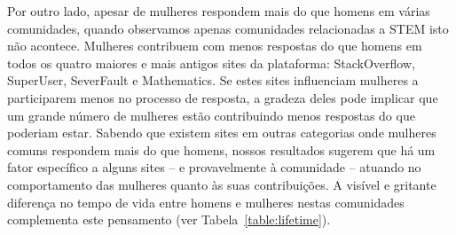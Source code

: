 


Por outro lado, apesar de mulheres respondem mais do que homens em várias comunidades, quando observamos apenas comunidades relacionadas a STEM isto não acontece. Mulheres contribuem com menos respostas do que homens em todos os quatro maiores e mais antigos sites da plataforma: StackOverflow, SuperUser, SeverFault e Mathematics. Se estes sites influenciam mulheres a participarem menos no processo de resposta, a gradeza deles pode implicar que um grande número de mulheres estão contribuindo menos respostas do que poderiam estar. Sabendo que existem sites em outras categorias onde mulheres comuns respondem mais do que homens, nossos resultados sugerem que há um fator específico a alguns sites -- e provavelmente à comunidade -- atuando no comportamento das mulheres quanto às suas contribuições. A visível e gritante diferença no tempo de vida entre homens e mulheres nestas comunidades complementa este pensamento (ver Tabela~\ref{table:lifetime}).

